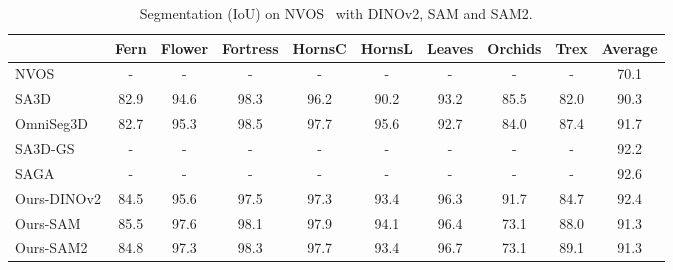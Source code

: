 \begin{table}[t!]
  \centering
  \footnotesize
\begin{tabular}{lccccccccc}
\toprule
& Fern & Flower & Fortress & HornsC & HornsL & Leaves & Orchids & Trex & Average \\
\midrule
NVOS & - & - & - & - & - & - & - & - & 70.1  \\
SA3D & 82.9 & 94.6 & 98.3 & 96.2 & 90.2 & 93.2 & 85.5 & 82.0 & 90.3  \\
OmniSeg3D & 82.7 & 95.3 & 98.5 & 97.7 & 95.6 & 92.7 & 84.0 & 87.4 & 91.7  \\
SA3D-GS & - & - & - & - & - & - & - & - & 92.2  \\
SAGA & - & - & - & - & - & - & - & - & 92.6  \\
Ours-DINOv2 & 84.5 & 95.6 & 97.5 & 97.3 & 93.4 &  96.3 & 91.7 & 84.7 & 92.4    \\
Ours-SAM & 85.5 & 97.6 & 98.1 & 97.9 & 94.1 & 96.4 & 73.1 & 88.0  & 91.3    \\
Ours-SAM2 & 84.8 & 97.3 & 98.3 & 97.7 & 93.4 & 96.7 & 73.1 & 89.1 & 91.3    \\
\hline
\end{tabular}
  \caption{Segmentation (IoU) on NVOS~\citep{ren2022nvos} with DINOv2, SAM and SAM2.}
  \label{tab:nvos}
\end{table}